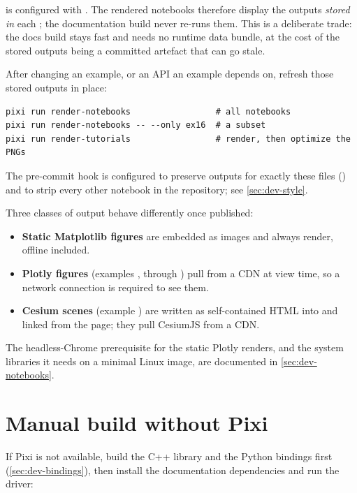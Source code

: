  is configured with . The
rendered notebooks therefore display the outputs \emph{stored in} each
; the documentation build never re-runs them. This is a
deliberate trade: the docs build stays fast and needs no runtime data bundle,
at the cost of the stored outputs being a committed artefact that can go stale.

After changing an example, or an API an example depends on, refresh those
stored outputs in place:

\begin{lstlisting}[language=shell]
pixi run render-notebooks                 # all notebooks
pixi run render-notebooks -- --only ex16  # a subset
pixi run render-tutorials                 # render, then optimize the PNGs
\end{lstlisting}

The  pre-commit hook is configured to preserve outputs for
exactly these files () and to strip every
other notebook in the repository; see \cref{sec:dev-style}.

Three classes of output behave differently once published:

\begin{itemize}[leftmargin=1.4em]
  \item \textbf{Static Matplotlib figures} are embedded as images and always
    render, offline included.
  \item \textbf{Plotly figures} (examples ,  through
    ) pull  from a CDN at view time, so a network
    connection is required to see them.
  \item \textbf{Cesium scenes} (example ) are written as
    self-contained HTML into  and linked
    from the page; they pull CesiumJS from a CDN.
\end{itemize}

The headless-Chrome prerequisite for the static Plotly renders, and the
system libraries it needs on a minimal Linux image, are documented in
\cref{sec:dev-notebooks}.

\section{Manual build without Pixi}
\label{sec:bd-manual}

If Pixi is not available, build the C++ library and the Python bindings first
(\cref{sec:dev-bindings}), then install the documentation dependencies and run
the driver:

